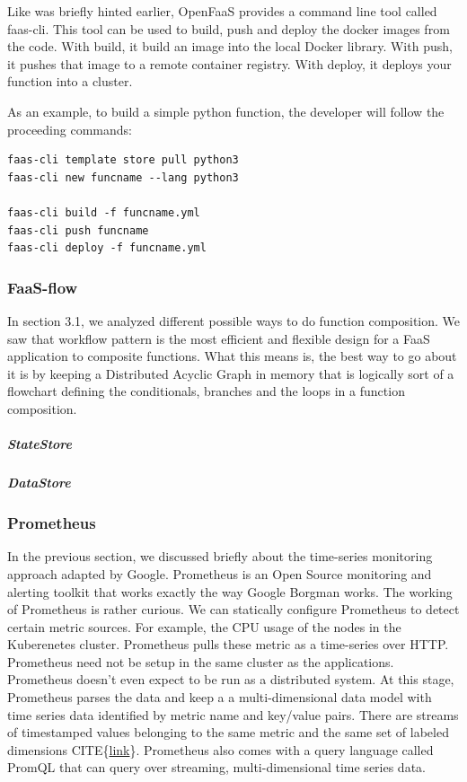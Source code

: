 \documentclass[12pt,titlepage]{article}
\begin{document}
Like was briefly hinted earlier, OpenFaaS provides a command line tool called
faas-cli. This tool can be used to build, push and deploy the docker images from
the code. With build, it build an image into the local Docker library. With
push, it pushes that image to a remote container registry. With deploy, it
deploys your function into a cluster.

As an example, to build a simple python function, the developer will follow the
proceeding commands:

\begin{lstlisting}
faas-cli template store pull python3
faas-cli new funcname --lang python3

faas-cli build -f funcname.yml
faas-cli push funcname
faas-cli deploy -f funcname.yml
\end{lstlisting}

\subsubsection{FaaS-flow}
\label{sec:org3bd9dee}
In section 3.1, we analyzed different possible ways to do function composition.
We saw that workflow pattern is the most efficient and flexible design for a
FaaS application to composite functions. What this means is, the best way to go
about it is by keeping a Distributed Acyclic Graph in memory that is logically
sort of a flowchart defining the conditionals, branches and the loops in a
function composition.  
\subparagraph{StateStore}
\label{sec:orgac6fa65}
\subparagraph{DataStore}
\label{sec:org66dbef4}

\subsubsection{Prometheus}
\label{sec:orgcfa81a3}
In the previous section, we discussed briefly about the time-series monitoring
approach adapted by Google. Prometheus is an Open Source monitoring and alerting
toolkit that works exactly the way Google Borgman works. The working of
Prometheus is rather curious. We can statically configure Prometheus to detect
certain metric sources. For example, the CPU usage of the nodes in the
Kuberenetes cluster. Prometheus pulls these metric as a time-series over HTTP.
Prometheus need not be setup in the same cluster as the applications. Prometheus
doesn't even expect to be run as a distributed system. At this stage, Prometheus
parses the data and keep a a multi-dimensional data model with time series data
identified by metric name and key/value pairs. There are streams of timestamped
values belonging to the same metric and the same set of labeled dimensions
CITE\{\href{https://prometheus.io/docs/concepts/data\_model/}{link}\}. Prometheus also comes with a query language called PromQL that can
query over streaming, multi-dimensional time series data.
\end{document}
